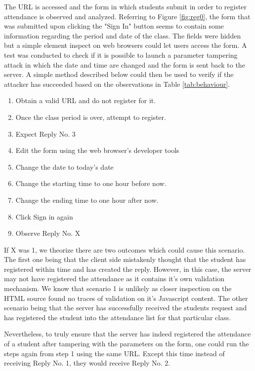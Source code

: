 \documentclass[runningheads]{llncs}
\begin{document}
The URL is accessed and the form in which students submit in order to register attendance is observed and analyzed. Referring to Figure \ref{fig:reg0}, the form that was submitted upon clicking the "Sign In" button seems to contain some information regarding the period and date of the class. The fields were hidden but a simple element inspect on web browsers could let users access the form. A test was conducted to check if it is possible to launch a parameter tampering attack in which the date and time are changed and the form is sent back to the server. A simple method described below could then be used to verify if the attacker has succeeded based on the observations in Table \ref{tab:behaviour}.

\begin{enumerate}
    \item Obtain a valid URL and do not register for it.
    \item Once the class period is over, attempt to register.
    \item Expect Reply No. 3
    \item Edit the form using the web browser's developer tools
    \item Change the date to today's date
    \item Change the starting time to one hour before now.
    \item Change the ending time to one hour after now.
    \item Click Sign in again
    \item Observe Reply No. X
\end{enumerate}

\clearpage{}

If X was 1, we theorize there are two outcomes which could cause this scenario. The first one being that the client side mistakenly thought that the student has registered within time and has created the reply. However, in this case, the server may not have registered the attendance as it contains it's own validation mechanism. We know that scenario 1 is unlikely as closer inspection on the HTML source found no traces of validation on it's Javascript content. The other scenario being that the server has successfully received the students request and has registered the student into the attendance list for that particular class.

Nevertheless, to truly ensure that the server has indeed registered the attendance of a student after tampering with the parameters on the form, one could run the steps again from step 1 using the same URL. Except this time instead of receiving Reply No. 1, they would receive Reply No. 2.
\end{document}
